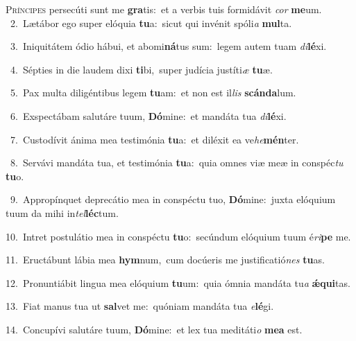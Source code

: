 \lettrine{\initial\textcolor{\initialcolor}{P}}{ríncipes} persecúti sunt me \textbf{gra}\-tis:~\star et a verbis tuis formidávit \textit{cor} \textbf{me}\-um.\\
{\numbfont\textcolor{\numbcolor}{~2.}}~Lætábor ego super elóquia \textbf{tu}\-a:~\star sicut qui invénit spóli\textit{a} \textbf{mul}\-ta.\par
{\numbfont\textcolor{\numbcolor}{~3.}}~Iniquitátem ódio hábui, et abomi\-\textbf{ná}\-tus sum:~\star legem autem tuam \textit{di}\-\textbf{lé}xi.\par
{\numbfont\textcolor{\numbcolor}{~4.}}~Sépties in die laudem dixi \textbf{ti}\-bi,~\star super judícia justíti\textit{æ} \textbf{tu}\-æ.\par
{\numbfont\textcolor{\numbcolor}{~5.}}~Pax multa diligéntibus legem \textbf{tu}\-am:~\star et non est il\textit{lis} \textbf{scán}\-\textbf{da}lum.\par
{\numbfont\textcolor{\numbcolor}{~6.}}~Exspectábam salutáre tuum, \textbf{Dó}\-mine:~\star et mandáta tua \textit{di}\-\textbf{lé}xi.\par
{\numbfont\textcolor{\numbcolor}{~7.}}~Custodívit ánima mea testimónia \textbf{tu}\-a:~\star et diléxit ea ve\-\textit{he}\-\textbf{mén}ter.\par
{\numbfont\textcolor{\numbcolor}{~8.}}~Servávi mandáta tua, et testimónia \textbf{tu}\-a:~\star quia omnes viæ meæ in conspéc\textit{tu} \textbf{tu}\-o.\par
{\numbfont\textcolor{\numbcolor}{~9.}}~Appropínquet deprecátio mea in conspéctu tuo, \textbf{Dó}\-mine:~\star juxta elóquium tuum da mihi in\-\textit{tel}\-\textbf{léc}tum.\par
{\numbfont\textcolor{\numbcolor}{10.}}~Intret postulátio mea in conspéctu \textbf{tu}\-o:~\star secúndum elóquium tuum é\-\textit{ri}\-\textbf{pe} me.\par
{\numbfont\textcolor{\numbcolor}{11.}}~Eructábunt lábia mea \textbf{hym}\-num,~\star cum docúeris me justificatió\textit{nes} \textbf{tu}\-as.\par
{\numbfont\textcolor{\numbcolor}{12.}}~Pronuntiábit lingua mea elóquium \textbf{tu}\-um:~\star quia ómnia mandáta tu\textit{a} \textbf{ǽ}\-\textbf{qui}tas.\par
{\numbfont\textcolor{\numbcolor}{13.}}~Fiat manus tua ut \textbf{sal}\-vet me:~\star quóniam mandáta tua \textit{e}\-\textbf{lé}gi.\par
{\numbfont\textcolor{\numbcolor}{14.}}~Concupívi salutáre tuum, \textbf{Dó}\-mine:~\star et lex tua meditáti\textit{o} \textbf{me}\-\textbf{a} est.\par
